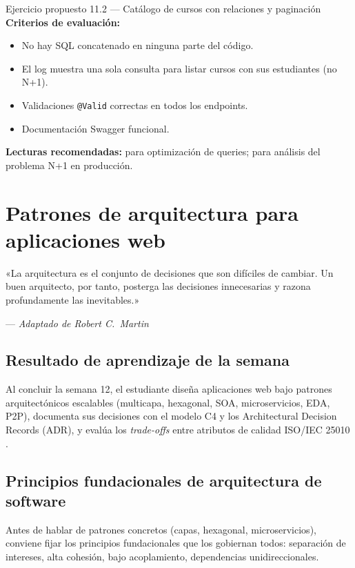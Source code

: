 \documentclass[11pt,a4paper,openany]{book}
\begin{document}
\begin{cajaejercicio}{Ejercicio propuesto 11.2 --- Catálogo de cursos con relaciones y paginación}
\textbf{Criterios de evaluación:}
\begin{itemize}
\item No hay SQL concatenado en ninguna parte del código.
\item El log muestra una sola consulta para listar cursos con sus
estudiantes (no N+1).
\item Validaciones \texttt{@Valid} correctas en todos los endpoints.
\item Documentación Swagger funcional.
\end{itemize}

\textbf{Lecturas recomendadas:} \cite{ottinger2017hibernate} para
optimización de queries; \cite{ottinger2017hibernate} para análisis del
problema N+1 en producción.
\end{cajaejercicio}

\chapter{Patrones de arquitectura para aplicaciones web}
\label{cap:semana12}

\epigraph{«La arquitectura es el conjunto de decisiones que son
difíciles de cambiar. Un buen arquitecto, por tanto, posterga las
decisiones innecesarias y razona profundamente las inevitables.»}
{--- \textit{Adaptado de Robert C.~Martin}}

\section*{Resultado de aprendizaje de la semana}
Al concluir la semana 12, el estudiante diseña aplicaciones web bajo
patrones arquitectónicos escalables (multicapa, hexagonal, SOA,
microservicios, EDA, P2P), documenta sus decisiones con el modelo C4
\cite{brown2023c4} y los Architectural Decision Records (ADR), y
evalúa los \emph{trade-offs} entre atributos de calidad ISO/IEC 25010
\cite{iso25010}.

\section{Principios fundacionales de arquitectura de software}

Antes de hablar de patrones concretos (capas, hexagonal,
microservicios), conviene fijar los principios fundacionales que los
gobiernan todos: separación de intereses, alta cohesión, bajo
acoplamiento, dependencias unidireccionales.
\end{document}
